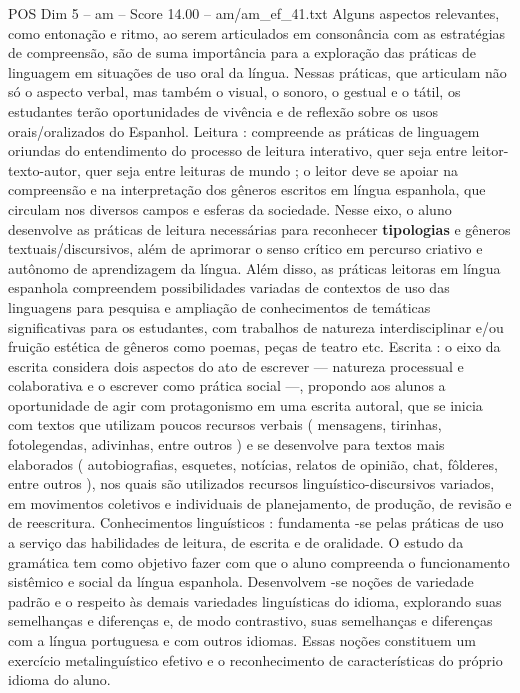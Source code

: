\begin{textsample}{POS Dim 5 – am – Score 14.00 – am/am\_ef\_41.txt}
Alguns aspectos relevantes, como entonação e ritmo, ao serem articulados em consonância com as estratégias de compreensão, são de suma importância para a exploração das práticas de linguagem em situações de uso oral da língua.
Nessas práticas, que articulam não só o aspecto verbal, mas também o visual, o sonoro, o gestual e o tátil, os estudantes terão oportunidades de vivência e de reflexão sobre os usos orais/oralizados do Espanhol.
Leitura : compreende as práticas de linguagem oriundas do entendimento do processo de leitura interativo, quer seja entre leitor-texto-autor, quer seja entre leituras de mundo ; o leitor deve se apoiar na compreensão e na interpretação dos gêneros escritos em língua espanhola, que circulam nos diversos campos e esferas da sociedade.
Nesse eixo, o aluno desenvolve as práticas de leitura necessárias para reconhecer \textbf{tipologias} e gêneros textuais/discursivos, além de aprimorar o senso crítico em percurso criativo e autônomo de aprendizagem da língua.
Além disso, as práticas leitoras em língua espanhola compreendem possibilidades variadas de contextos de uso das linguagens para pesquisa e ampliação de conhecimentos de temáticas significativas para os estudantes, com trabalhos de natureza interdisciplinar e/ou fruição estética de gêneros como poemas, peças de teatro etc.
Escrita : o eixo da escrita considera dois aspectos do ato de escrever — natureza processual e colaborativa e o escrever como prática social —, propondo aos alunos a oportunidade de agir com protagonismo em uma escrita autoral, que se inicia com textos que utilizam poucos recursos verbais ( mensagens, tirinhas, fotolegendas, adivinhas, entre outros ) e se desenvolve para textos mais elaborados ( autobiografias, esquetes, notícias, relatos de opinião, chat, fôlderes, entre outros ), nos quais são utilizados recursos linguístico-discursivos variados, em movimentos coletivos e individuais de planejamento, de produção, de revisão e de reescritura.
Conhecimentos linguísticos : fundamenta -se pelas práticas de uso a serviço das habilidades de leitura, de escrita e de oralidade.
O estudo da gramática tem como objetivo fazer com que o aluno compreenda o funcionamento sistêmico e social da língua espanhola.
Desenvolvem -se noções de variedade padrão e o respeito às demais variedades linguísticas do idioma, explorando suas semelhanças e diferenças e, de modo contrastivo, suas semelhanças e diferenças com a língua portuguesa e com outros idiomas.
Essas noções constituem um exercício metalinguístico efetivo e o reconhecimento de características do próprio idioma do aluno.

\end{textsample}
